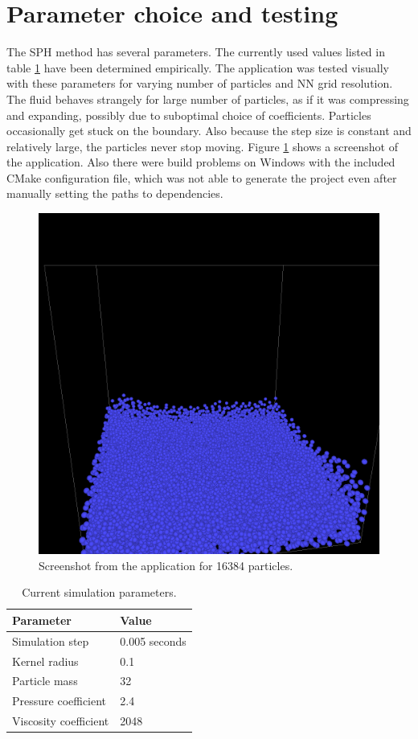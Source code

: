 \documentclass[a4paper,report]{IEEEtran}
\begin{document}
\section{Parameter choice and testing}
The SPH method has several parameters. The currently used values listed in table \ref{table:parameters} have been determined empirically. The application was tested visually with these parameters for varying number of particles and NN grid resolution. The fluid behaves strangely for large number of particles, as if it was compressing and expanding, possibly due to suboptimal choice of coefficients. Particles occasionally get stuck on the boundary. Also because the step size is constant and relatively large, the particles never stop moving. Figure \ref{fig:screen} shows a screenshot of the application. Also there were build problems on Windows with the included CMake configuration file, which was not able to generate the project even after manually setting the paths to dependencies. 

\begin{figure}[!h]
\centering
\includegraphics[width=1\linewidth]{screenshot}
\caption{Screenshot from the application for 16384 particles.}
\label{fig:screen}
\end{figure}

\begin{table}[h]
	\normalsize
	\centering
	\begin{tabular}{|l|l|}
		\hline
		\textbf{Parameter} & \textbf{Value} \\
		\hline
		\hline
		Simulation step 	& 0.005 seconds \\
		Kernel radius 	& 0.1 \\
		Particle mass 	& 32 \\
		Pressure coefficient	& 2.4 \\ 
		Viscosity coefficient 	& 2048 \\
		\hline
	\end{tabular}
	\caption{Current simulation parameters.}
	\label{table:parameters}
\end{table}
\end{document}
